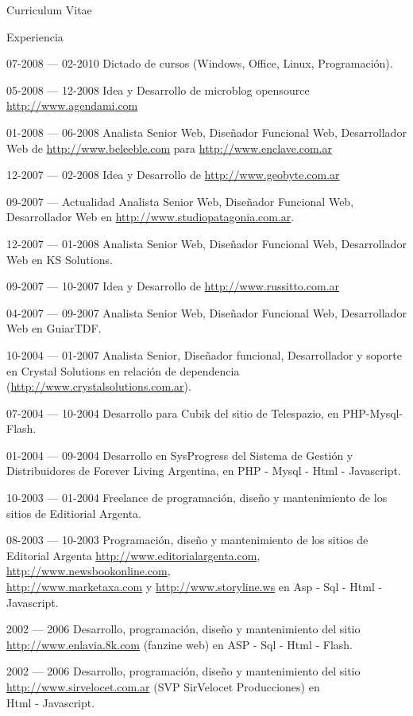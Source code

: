 \documentclass[a4paper]{article}
\begin{document}
\begin{cv}{Curriculum Vitae}
\begin{cvlist}{Experiencia}
      \item[07-2008 --- 02-2010] Dictado de cursos (Windows, Office, Linux, Programación).
      \item[05-2008 --- 12-2008] Idea y Desarrollo de microblog opensource \url{http://www.agendami.com}
      \item[01-2008 --- 06-2008] Analista Senior Web, Diseñador Funcional Web, Desarrollador Web de \url{http://www.beleeble.com} para \url{http://www.enclave.com.ar}
      \item[12-2007 --- 02-2008] Idea y Desarrollo de \url{http://www.geobyte.com.ar}
      \item[09-2007 --- Actualidad] Analista Senior Web, Diseñador Funcional Web, Desarrollador Web en \url{http://www.studiopatagonia.com.ar}.
      \item[12-2007 --- 01-2008] Analista Senior Web, Diseñador Funcional Web, Desarrollador Web en KS Solutions.
      \item[09-2007 --- 10-2007] Idea y Desarrollo de \url{http://www.russitto.com.ar}
      \item[04-2007 --- 09-2007] Analista Senior Web, Diseñador Funcional Web, Desarrollador Web en GuiarTDF.
      \item[10-2004 --- 01-2007] Analista Senior, Diseñador funcional, Desarrollador y soporte en Crystal Solutions en relación de dependencia (\url{http://www.crystalsolutions.com.ar}).
      \item[07-2004 --- 10-2004] Desarrollo para Cubik del sitio de Telespazio, en PHP-Mysql-Flash.
      \item[01-2004 --- 09-2004] Desarrollo en SysProgress del Sistema de Gestión y Distribuidores de Forever Living Argentina, en PHP - Mysql - Html - Javascript.
      \item[10-2003 --- 01-2004] Freelance de programación, diseño y mantenimiento de los sitios de Editiorial Argenta.
      \item[08-2003 --- 10-2003] Programación, diseño y mantenimiento de los sitios de Editorial Argenta \url{http://www.editorialargenta.com}, \url{http://www.newsbookonline.com},\\\url{http://www.marketaxa.com} y \url{http://www.storyline.ws} en Asp - Sql - Html - Javascript.
      \item[2002 --- 2006] Desarrollo, programación, diseño y mantenimiento del sitio\\\url{http://www.enlavia.8k.com} (fanzine web) en ASP - Sql - Html - Flash.
      \item[2002 --- 2006] Desarrollo, programación, diseño y mantenimiento del sitio\\\url{http://www.sirvelocet.com.ar} (SVP SirVelocet Producciones) en\\Html - Javascript.

\end{cvlist}
\end{cv}
\end{document}
